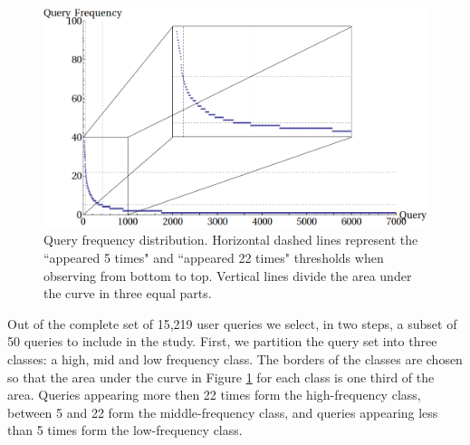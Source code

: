 \begin{figure}[tb]
\centering
\includegraphics[scale=.3]{ecir:query-freq}
\caption{Query frequency distribution. Horizontal dashed lines represent the ``appeared 5 times" and ``appeared 22 times" thresholds when observing from bottom to top. Vertical lines divide the area under the curve in three equal parts.}
\label{fig:query-frequency}
\end{figure}

Out of the complete set of 15,219 user queries we select, in two steps, a subset of 50 queries to include in the study. 
First, we partition the query set into three classes: a high, mid and low frequency class. The borders of the classes are chosen so that the area under the curve in Figure \ref{fig:query-frequency} for each class is one third of the area. Queries appearing more then 22 times form the high-frequency class, between 5 and 22 form the middle-frequency class, and queries appearing less than 5 times form the low-frequency class.

